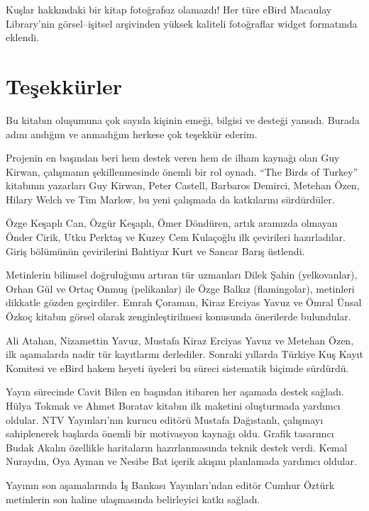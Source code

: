 \documentclass[
  10.5pt,
  a4paper,
  DIV=11,
  numbers=noendperiod,
  twocolumn]{scrreprt}
\begin{document}
Kuşlar hakkındaki bir kitap fotoğrafsız olamazdı! Her türe eBird
Macaulay Library'nin görsel--işitsel arşivinden yüksek kaliteli
fotoğraflar widget formatında eklendi.

\chapter*{Teşekkürler}\label{teux15fekkuxfcrler}


Bu kitabın oluşumuna çok sayıda kişinin emeği, bilgisi ve desteği
yansıdı. Burada adını andığım ve anmadığım herkese çok teşekkür ederim.

Projenin en başından beri hem destek veren hem de ilham kaynağı olan Guy
Kirwan, çalışmanın şekillenmesinde önemli bir rol oynadı. ``The Birds of
Turkey'' kitabının yazarları Guy Kirwan, Peter Castell, Barbaros
Demirci, Metehan Özen, Hilary Welch ve Tim Marlow, bu yeni çalışmada da
katkılarını sürdürdüler.

Özge Keşaplı Can, Özgür Keşaplı, Ömer Döndüren, artık aramızda olmayan
Önder Cirik, Utku Perktaş ve Kuzey Cem Kulaçoğlu ilk çevirileri
hazırladılar. Giriş bölümünün çevirilerini Bahtiyar Kurt ve Sancar Barış
üstlendi.

Metinlerin bilimsel doğruluğunu artıran tür uzmanları Dilek Şahin
(yelkovanlar), Orhan Gül ve Ortaç Onmuş (pelikanlar) ile Özge Balkız
(flamingolar), metinleri dikkatle gözden geçirdiler. Emrah Çoraman,
Kiraz Erciyas Yavuz ve Ömral Ünsal Özkoç kitabın görsel olarak
zenginleştirilmesi konusunda önerilerde bulundular.

Ali Atahan, Nizamettin Yavuz, Mustafa Kiraz Erciyas Yavuz ve Metehan
Özen, ilk aşamalarda nadir tür kayıtlarını derlediler. Sonraki yıllarda
Türkiye Kuş Kayıt Komitesi ve eBird hakem heyeti üyeleri bu süreci
sistematik biçimde sürdürdü.

Yayın sürecinde Cavit Bilen en başından itibaren her aşamada destek
sağladı. Hülya Tokmak ve Ahmet Boratav kitabın ilk maketini oluşturmada
yardımcı oldular. NTV Yayınları'nın kurucu editörü Mustafa Dağıstanlı,
çalışmayı sahiplenerek başlarda önemli bir motivasyon kaynağı oldu.
Grafik tasarımcı Budak Akalın özellikle haritaların hazırlanmasında
teknik destek verdi. Kemal Nuraydın, Oya Ayman ve Nesibe Bat içerik
akışını planlamada yardımcı oldular.

Yayının son aşamalarında İş Bankası Yayınları'ndan editör Cumhur Öztürk
metinlerin son haline ulaşmasında belirleyici katkı sağladı.
\end{document}
